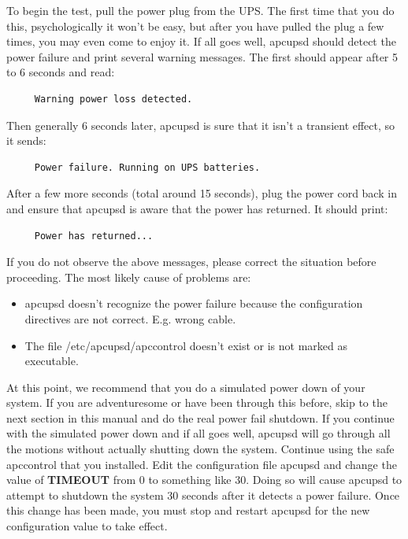 To begin the test, pull the power plug from the UPS. The first time that you
do this, psychologically it won't be easy, but after you have pulled the plug
a few times, you may even come to enjoy it. If all goes well, apcupsd should
detect the power failure and print several warning messages. The first should
appear after 5 to 6 seconds and read: 

\footnotesize
\begin{verbatim}
     Warning power loss detected.
\end{verbatim}
\normalsize

Then generally 6 seconds later, apcupsd is sure that it isn't a transient
effect, so it sends: 

\footnotesize
\begin{verbatim}
     Power failure. Running on UPS batteries.
\end{verbatim}
\normalsize

After a few more seconds (total around 15 seconds), plug the power cord back
in and ensure that apcupsd is aware that the power has returned. It should
print: 

\footnotesize
\begin{verbatim}
     Power has returned...
\end{verbatim}
\normalsize

If you do not observe the above messages, please correct the situation before
proceeding. The most likely cause of problems are:  

\begin{itemize}
\item apcupsd doesn't recognize the power failure because the configuration
   directives are not correct. E.g. wrong cable.  
\item The file /etc/apcupsd/apccontrol doesn't exist or is not marked as
   executable. 
   \end{itemize}

At this point, we recommend that you do a simulated power down of your system.
If you are adventuresome or have been through this before, skip to the next
section in this manual and do the real power fail shutdown. If you continue
with the simulated power down and if all goes well, apcupsd will go through
all the motions without actually shutting down the system. Continue using the
safe apccontrol that you installed. Edit the configuration file apcupsd and
change the value of {\bf TIMEOUT} from 0 to something like 30. Doing so will
cause apcupsd to attempt to shutdown the system 30 seconds after it detects a
power failure. Once this change has been made, you must stop and restart
apcupsd for the new configuration value to take effect.  

